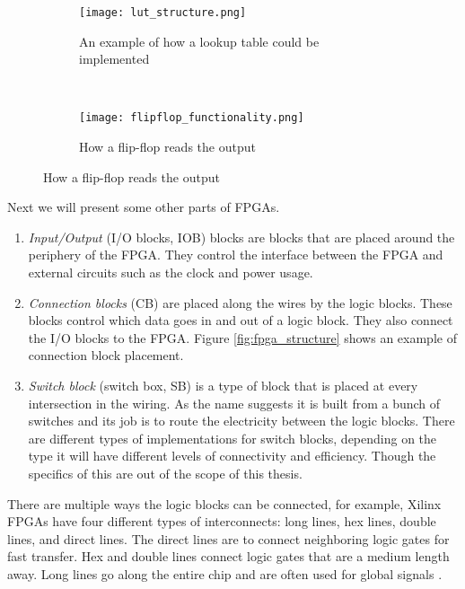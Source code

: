 \begin{figure}[H]
    \begin{subfigure}[b]{.4\textwidth}
        \centering
        \texttt{[image: lut\_structure.png]}
        \caption{An example of how a lookup table could be implemented}
        \label{fig:lut_flipflop}
    \end{subfigure}
    ~
    \centering
    \begin{subfigure}[b]{.4\textwidth}
        \centering
        \texttt{[image: flipflop\_functionality.png]}
        \caption{How a flip-flop reads the output}
        \label{fig:flipflop_func}
    \end{subfigure}
\end{figure}


Next we will present some other parts of FPGAs.

\begin{enumerate}
    \item

        \textit{Input/Output} (I/O blocks, IOB) blocks are blocks that are placed
        around the periphery of the FPGA. They control the interface between
        the FPGA and external circuits such as the clock and power usage.

    \item

        \textit{Connection blocks} (CB) are placed along the wires by the logic
        blocks. These blocks control which data goes in and out of a logic
        block. They also connect the I/O blocks to the FPGA. Figure
        \ref{fig:fpga_structure} shows an example of connection block
        placement.

    \item

        \textit{Switch block} (switch box, SB) is a type of block that is
        placed at every intersection in the wiring. As the name suggests it is
        built from a bunch of switches and its job is to route the electricity
        between the logic blocks. There are different types of implementations
        for switch blocks, depending on the type it will have different levels
        of connectivity and efficiency. Though the specifics of this are out of
        the scope of this thesis.

\end{enumerate}

There are multiple ways the logic blocks can be connected, for example,
Xilinx FPGAs have four different types of interconnects: long lines,
hex lines, double lines, and direct lines. The direct lines are to
connect neighboring logic gates for fast transfer. Hex and double lines
connect logic gates that are a medium length away. Long lines go along
the entire chip and are often used for global signals
\citep{HideharuAmano8}.

